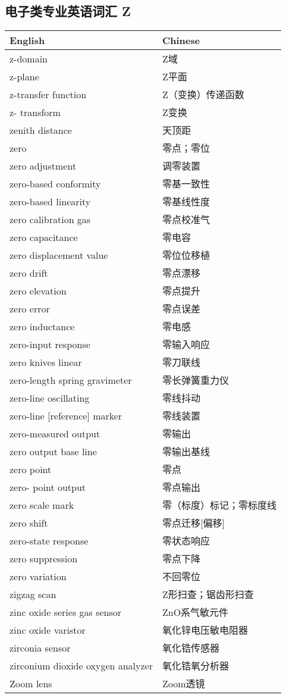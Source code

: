 \documentclass[
]{article}
\begin{document}
\hypertarget{ux7535ux5b50ux7c7bux4e13ux4e1aux82f1ux8bedux8bcdux6c47-z}{%
\subsection{\texorpdfstring{电子类专业英语词汇 Z
}{电子类专业英语词汇 Z }}\label{ux7535ux5b50ux7c7bux4e13ux4e1aux82f1ux8bedux8bcdux6c47-z}}

\begin{longtable}[]{@{}ll@{}}
\toprule()
English & Chinese \\
\midrule()
\endhead
z-domain & Z域 \\
z-plane & Z平面 \\
z-transfer function & Z（变换）传递函数 \\
z- transform & Z变换 \\
zenith distance & 天顶距 \\
zero & 零点；零位 \\
zero adjustment & 调零装置 \\
zero-based conformity & 零基一致性 \\
zero-based linearity & 零基线性度 \\
zero calibration gas & 零点校准气 \\
zero capacitance & 零电容 \\
zero displacement value & 零位位移植 \\
zero drift & 零点漂移 \\
zero elevation & 零点提升 \\
zero error & 零点误差 \\
zero inductance & 零电感 \\
zero-input response & 零输入响应 \\
zero knives linear & 零刀联线 \\
zero-length spring gravimeter & 零长弹簧重力仪 \\
zero-line oscillating & 零线抖动 \\
zero-line {[}reference{]} marker & 零线装置 \\
zero-measured output & 零输出 \\
zero output base line & 零输出基线 \\
zero point & 零点 \\
zero- point output & 零点输出 \\
zero scale mark & 零（标度）标记；零标度线 \\
zero shift & 零点迁移{[}偏移{]} \\
zero-state response & 零状态响应 \\
zero suppression & 零点下降 \\
zero variation & 不回零位 \\
zigzag scan & Z形扫查；锯齿形扫查 \\
zinc oxide series gas sensor & ZnO系气敏元件 \\
zinc oxide varistor & 氧化锌电压敏电阻器 \\
zirconia sensor & 氧化锆传感器 \\
zirconium dioxide oxygen analyzer & 氧化锆氧分析器 \\
Zoom lens & Zoom透镜 \\
\bottomrule()
\end{longtable}
\end{document}
